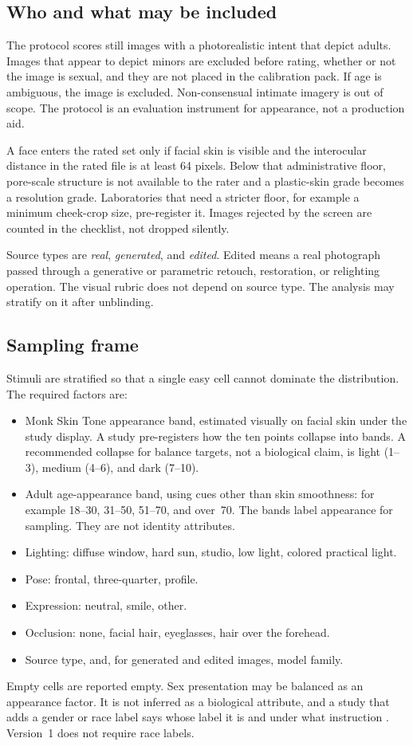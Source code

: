 \documentclass[10pt,twocolumn]{article}
\begin{document}
\subsection{Who and what may be included}

The protocol scores still images with a photorealistic intent that depict adults. Images that appear to depict minors are excluded before rating, whether or not the image is sexual, and they are not placed in the calibration pack. If age is ambiguous, the image is excluded. Non-consensual intimate imagery is out of scope. The protocol is an evaluation instrument for appearance, not a production aid.

A face enters the rated set only if facial skin is visible and the interocular distance in the rated file is at least 64 pixels. Below that administrative floor, pore-scale structure is not available to the rater and a plastic-skin grade becomes a resolution grade. Laboratories that need a stricter floor, for example a minimum cheek-crop size, pre-register it. Images rejected by the screen are counted in the checklist, not dropped silently.

Source types are \emph{real}, \emph{generated}, and \emph{edited}. Edited means a real photograph passed through a generative or parametric retouch, restoration, or relighting operation. The visual rubric does not depend on source type. The analysis may stratify on it after unblinding.

\subsection{Sampling frame}

Stimuli are stratified so that a single easy cell cannot dominate the distribution. The required factors are:
\begin{itemize}
  \item Monk Skin Tone appearance band, estimated visually on facial skin under the study display. A study pre-registers how the ten points collapse into bands. A recommended collapse for balance targets, not a biological claim, is light (1--3), medium (4--6), and dark (7--10).
  \item Adult age-appearance band, using cues other than skin smoothness: for example 18--30, 31--50, 51--70, and over~70. The bands label appearance for sampling. They are not identity attributes.
  \item Lighting: diffuse window, hard sun, studio, low light, colored practical light.
  \item Pose: frontal, three-quarter, profile.
  \item Expression: neutral, smile, other.
  \item Occlusion: none, facial hair, eyeglasses, hair over the forehead.
  \item Source type, and, for generated and edited images, model family.
\end{itemize}
Empty cells are reported empty. Sex presentation may be balanced as an appearance factor. It is not inferred as a biological attribute, and a study that adds a gender or race label says whose label it is and under what instruction \cite{buolamwini2018}. Version~1 does not require race labels.
\end{document}
